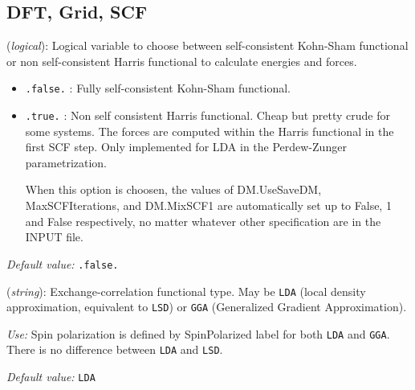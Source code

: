 \documentclass[11pt]{article}
\begin{document}
\vspace{5pt}
\subsection{DFT, Grid, SCF}

\begin{description}
\itemsep 10pt
\parsep 0pt

\item[{\bf Harris\_functional}] ({\it logical}): 
Logical variable to choose between self-consistent Kohn-Sham functional or
 non self-consistent Harris functional to calculate energies and forces. 
\begin{itemize}
\item {\tt .false.} : Fully self-consistent Kohn-Sham functional. 
\item {\tt .true.} : Non self consistent Harris functional. Cheap but
pretty crude for some systems. The forces are computed within the
Harris functional in the first SCF step. Only implemented for LDA in
the Perdew-Zunger parametrization.

When this option is choosen, the values of DM.UseSaveDM,
MaxSCFIterations, and DM.MixSCF1 are automatically set up to False, 1
and False respectively, no matter whatever other specification are in
the INPUT file.
\end{itemize}
    
{\it Default value:} {\tt .false.} 

\item[{\bf XC.functional}] ({\it string}): 
Exchange-correlation functional type. May be {\tt LDA} 
(local density approximation, equivalent to {\tt LSD}) or 
{\tt GGA} (Generalized Gradient Approximation). 

{\it Use:} Spin polarization is defined by SpinPolarized label for
both {\tt LDA} and {\tt GGA}. There is no difference between {\tt LDA}
and {\tt LSD}.

{\it Default value:} {\tt LDA}
        


\end{description}
\end{document}
